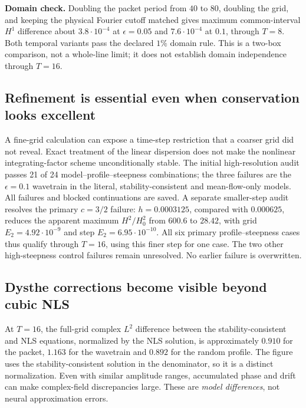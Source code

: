 \textbf{Domain check.} Doubling the packet period from $40$ to $80$, doubling the grid, and keeping the physical Fourier cutoff matched gives maximum common-interval $H^1$ difference about $3.8\cdot10^{-4}$ at $\epsilon=0.05$ and $7.6\cdot10^{-4}$ at $0.1$, through $T=8$. Both temporal variants pass the declared $1\%$ domain rule. This is a two-box comparison, not a whole-line limit; it does not establish domain independence through $T=16$.
\clearpage
\subsection{Refinement is essential even when conservation looks excellent}
A fine-grid calculation can expose a time-step restriction that a coarser grid did not reveal. Exact treatment of the linear dispersion does not make the nonlinear integrating-factor scheme unconditionally stable. The initial high-resolution audit passes 21 of 24 model--profile--steepness combinations; the three failures are the $\epsilon=0.1$ wavetrain in the literal, stability-consistent and mean-flow-only models. All failures and blocked continuations are saved. A separate smaller-step audit resolves the primary $c=3/2$ failure: $h=0.0003125$, compared with $0.000625$, reduces the apparent maximum $H^2/H^2_0$ from $600.6$ to $28.42$, with grid $E_2=4.92\cdot10^{-9}$ and step $E_2=6.95\cdot10^{-10}$. All six primary profile--steepness cases thus qualify through $T=16$, using this finer step for one case. The two other high-steepness control failures remain unresolved. No earlier failure is overwritten.
\clearpage
\subsection{Dysthe corrections become visible beyond cubic NLS}
At $T=16$, the full-grid complex $L^2$ difference between the stability-consistent and NLS equations, normalized by the NLS solution, is approximately $0.910$ for the packet, $1.163$ for the wavetrain and $0.892$ for the random profile. The figure uses the stability-consistent solution in the denominator, so it is a distinct normalization. Even with similar amplitude ranges, accumulated phase and drift can make complex-field discrepancies large. These are \emph{model differences}, not neural approximation errors.

